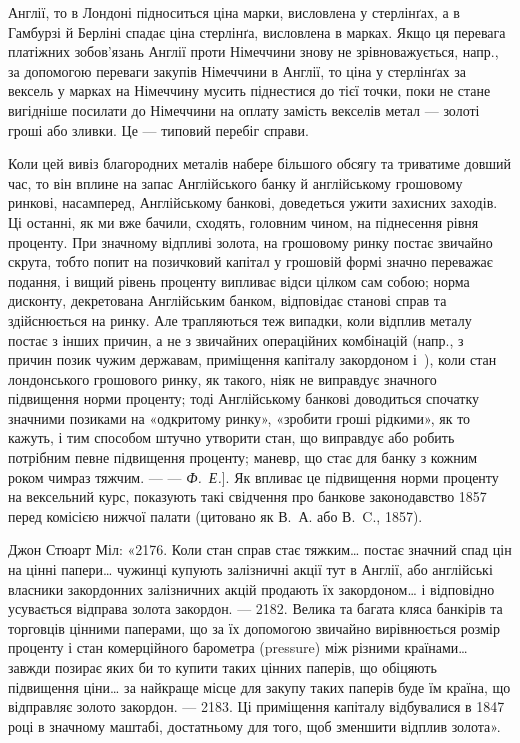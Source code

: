 \parcont{}  %
Англії, то в Лондоні підноситься ціна марки, висловлена у стерлінґах, а в Гамбурзі
й Берліні спадає ціна стерлінґа, висловлена в марках. Якщо ця перевага
платіжних зобов’язань Англії проти Німеччини знову не зрівноважується, напр.,
за допомогою переваги закупів Німеччини в Англії, то ціна у стерлінґах за
вексель у марках на Німеччину мусить піднестися до тієї точки, поки не стане
вигідніше посилати до Німеччини на оплату замість векселів метал — золоті гроші
або зливки. Це — типовий перебіг справи.

Коли цей вивіз благородних металів набере більшого обсягу та триватиме
довший час, то він вплине на запас Англійського банку й англійському грошовому
ринкові, насамперед, Англійському банкові, доведеться ужити захисних заходів.
Ці останні, як ми вже бачили, сходять, головним чином, на піднесення
рівня проценту. При значному відпливі золота, на грошовому ринку постає звичайно
скрута, тобто попит на позичковий капітал у грошовій формі значно
переважає подання, і вищий рівень проценту випливає відси цілком сам собою;
норма дисконту, декретована Англійським банком, відповідає станові справ та
здійснюється на ринку. Але трапляються теж випадки, коли відплив металу
постає з інших причин, а не з звичайних операційних комбінацій (напр., з причин
позик чужим державам, приміщення капіталу закордоном і~), коли стан
лондонського грошового ринку, як такого, ніяк не виправдує значного підвищення
норми проценту; тоді Англійському банкові доводиться спочатку значними
позиками на «одкритому ринку», «зробити гроші рідкими», як то кажуть, і тим
способом штучно утворити стан, що виправдує або робить потрібним певне підвищення
проценту; маневр, що стає для банку з кожним роком чимраз тяжчим. —
— \emph{Ф.~Е.}]. Як впливає це підвищення норми проценту на вексельний курс, показують
такі свідчення про банкове законодавство 1857~ перед комісією нижчої
палати (цитовано як В.~А. або В.~C., 1857).

Джон Стюарт Міл: «2176. Коли стан справ стає тяжким\dots{} постає значний
спад цін на цінні папери\dots{} чужинці купують залізничні акції тут в Англії,
або англійські власники закордонних залізничних акцій продають їх закордоном\dots{}
і відповідно усувається відправа золота закордон. — 2182. Велика та багата
кляса банкірів та торговців цінними паперами, що за їх допомогою звичайно
вирівнюється розмір проценту і стан комерційного барометра (pressure) між
різними країнами\dots{} завжди позирає яких би то купити таких цінних паперів,
що обіцяють підвищення ціни\dots{} за найкраще місце для закупу таких
паперів буде їм країна, що відправляє золото закордон. — 2183. Ці приміщення
капіталу відбувалися в 1847 році в значному маштабі, достатньому для того, щоб
зменшити відплив золота».

